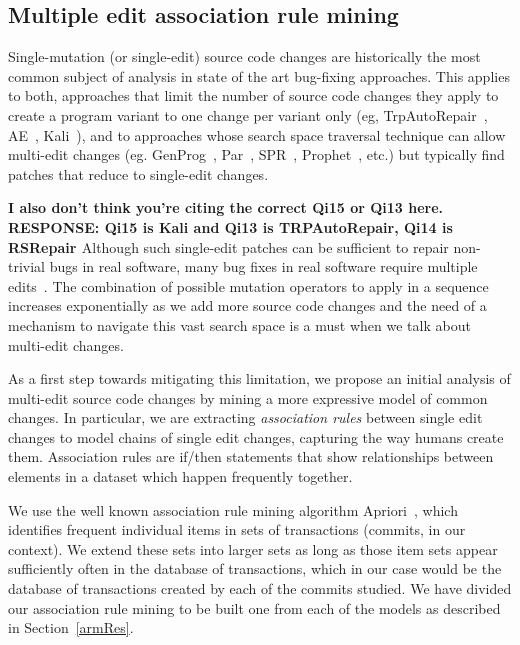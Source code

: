 \documentclass[conference]{IEEEtran}
\newcommand{\todo}[1]
  {{\scriptsize \textbf{\color{red} {#1}}}}
\begin{document}
\subsection{Multiple edit association rule mining} 
\label{multEdit}

Single-mutation (or single-edit) source code changes are historically the most 
common subject of analysis in 
state of the art bug-fixing
approaches. This applies to both, approaches that limit the number of source 
code changes they apply to create a program variant to one change per variant 
only (eg, TrpAutoRepair~\cite{Qi13}, AE~\cite{Weimer13}, Kali~\cite{Qi15}), and 
to approaches whose search space traversal technique can allow multi-edit 
changes (eg. GenProg~\cite{legoues12}, Par~\cite{kim2013}, SPR~\cite{fan15},
Prophet~\cite{Long2016}, etc.) but typically find patches that reduce to single-edit changes.

\todo{I also don't think you're
  citing the correct Qi15 or Qi13 here. RESPONSE: Qi15 is Kali and Qi13 is 
TRPAutoRepair, Qi14 is RSRepair }
Although such single-edit patches can be
sufficient to repair non-trivial bugs in real software, many bug fixes in real
software require multiple edits~\cite{Weimer13}. The combination of possible mutation
 operators to apply in a sequence increases exponentially as we add more source code changes 
 and the need of a mechanism to navigate this vast search space is a must when we talk about
 multi-edit changes.

As a first step towards mitigating this limitation, we propose 
an initial analysis of multi-edit 
source code changes by mining a more expressive model of common changes. In
particular, we are extracting \emph{association rules} between single edit changes 
to model chains of single edit changes, capturing the way humans create them.
Association rules are if/then statements that show relationships between elements in a dataset which happen frequently together.

We use the 
well known association rule mining algorithm
Apriori~\cite{Agrawal94,Liu98,Zaki2000}, which identifies frequent 
individual items in sets of transactions (commits, in our context).  We extend these sets into 
larger sets as long as those item sets appear sufficiently often in the database 
of transactions, which in our case would be the database of transactions created 
by each of the commits studied. We have divided our association rule mining to
be built one from each of the models as described in Section~\ref{armRes}. 
\end{document}
